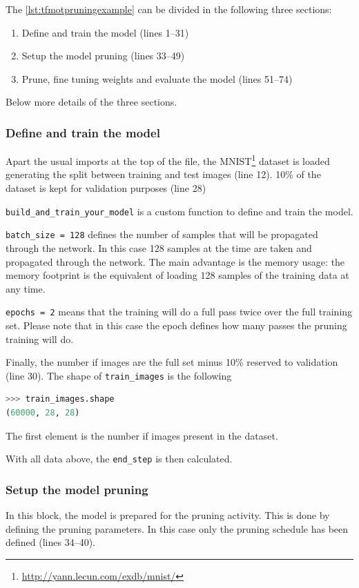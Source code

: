 The \autoref{lst:tfmotpruningexample} can be divided in the following three
sections:

\begin{enumerate}
    \item Define and train the model (lines 1--31)
    \item Setup the model pruning (lines 33--49)
    \item Prune, fine tuning weights and evaluate the model (lines 51--74)
\end{enumerate}

Below more details of the three sections.

\subsubsection{Define and train the model}
Apart the usual imports at the top of the file, the
MNIST\footnote{\url{http://yann.lecun.com/exdb/mnist/}} dataset is loaded
generating the split between training and test images (line 12).
10\% of the dataset is kept for validation purposes (line 28)

\texttt{build\_and\_train\_your\_model} is a custom function to define and
train the model.

\texttt{batch\_size = 128} defines the number of samples that will be
propagated through the network. In this case 128 samples at the time are taken
and propagated through the network.
The main advantage is the memory usage: the memory footprint is the equivalent
of loading 128 samples of the training data at any time.

\texttt{epochs = 2} means that the training will do a full pass twice over the
full training set. Please note that in this case the epoch defines how many
passes the pruning training will do.

Finally, the number if images are the full set minus 10\% reserved to
validation (line 30). The shape of \texttt{train\_images} is the following

\begin{lstlisting}[language=Python, caption=Shape of train\_images]
>>> train_images.shape
(60000, 28, 28)
\end{lstlisting}

The first element is the number if images present in the dataset.

With all data above, the \texttt{end\_step} is then calculated.

\subsubsection{Setup the model pruning}
In this block, the model is prepared for the pruning activity.
This is done by defining the pruning parameters. In this case only the pruning
schedule has been defined (lines 34--40).

